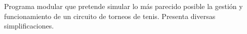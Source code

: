 Programa modular que pretende simular lo más parecido posible la gestión y funcionamiento de un circuito de torneos de tenis. Presenta diversas simplificaciones. 